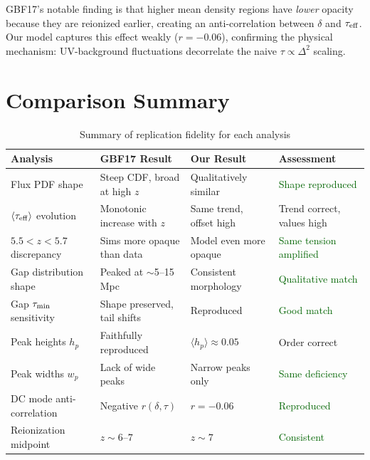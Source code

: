 \documentclass[11pt]{article}
\newcommand{\taueff}{\tau_{\rm eff}}
\newcommand{\taumin}{\tau_{\rm min}}
\begin{document}
GBF17's notable finding is that higher mean density regions have \emph{lower} opacity because they are reionized earlier, creating an anti-correlation between $\delta$ and $\taueff$. Our model captures this effect weakly ($r = -0.06$), confirming the physical mechanism: UV-background fluctuations decorrelate the naive $\tau \propto \Delta^2$ scaling.

\section{Comparison Summary}

\begin{table}[H]
\centering
\caption{Summary of replication fidelity for each analysis}
\label{tab:summary}
\small
{}
\begin{tabular}{@{}p{3.8cm}p{3cm}p{3cm}p{3.5cm}@{}}
\toprule
\textbf{Analysis} & \textbf{GBF17 Result} & \textbf{Our Result} & \textbf{Assessment} \\
\midrule
Flux PDF shape & Steep CDF, broad at high $z$ & Qualitatively similar & \textcolor{darkgreen}{Shape reproduced} \\
$\langle\taueff\rangle$ evolution & Monotonic increase with $z$ & Same trend, offset high & \textcolor{paperblue}{Trend correct, values high} \\
$5.5<z<5.7$ discrepancy & Sims more opaque than data & Model even more opaque & \textcolor{darkgreen}{Same tension amplified} \\
Gap distribution shape & Peaked at $\sim$5--15 Mpc & Consistent morphology & \textcolor{darkgreen}{Qualitative match} \\
Gap $\taumin$ sensitivity & Shape preserved, tail shifts & Reproduced & \textcolor{darkgreen}{Good match} \\
Peak heights $h_p$ & Faithfully reproduced & $\langle h_p\rangle \approx 0.05$ & \textcolor{paperblue}{Order correct} \\
Peak widths $w_p$ & Lack of wide peaks & Narrow peaks only & \textcolor{darkgreen}{Same deficiency} \\
DC mode anti-correlation & Negative $r(\delta,\tau)$ & $r = -0.06$ & \textcolor{darkgreen}{Reproduced} \\
Reionization midpoint & $z \sim 6$--$7$ & $z \sim 7$ & \textcolor{darkgreen}{Consistent} \\
\bottomrule
\end{tabular}
\end{table}
\end{document}
